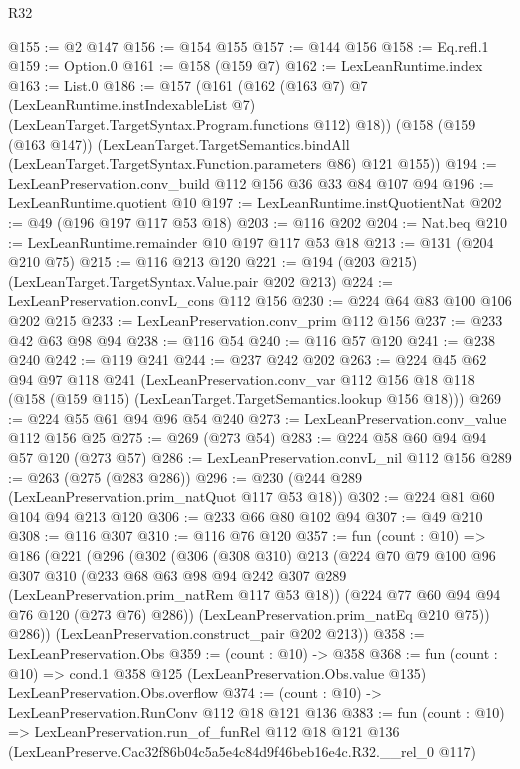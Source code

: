 \begin{lexlean}{R32}
\begin{coremodule}
@155 := @2 @147
@156 := @154 @155
@157 := @144 @156
@158 := Eq.refl.{1}
@159 := Option.{0}
@161 := @158 (@159 @7)
@162 := LexLeanRuntime.index
@163 := List.{0}
@186 := @157
    (@161
      (@162
        (@163 @7)
        @7
        (LexLeanRuntime.instIndexableList @7)
        (LexLeanTarget.TargetSyntax.Program.functions @112)
        @18))
    (@158
      (@159 (@163 @147))
      (LexLeanTarget.TargetSemantics.bindAll
        (LexLeanTarget.TargetSyntax.Function.parameters @86)
        @121
        @155))
@194 := LexLeanPreservation.conv_build @112 @156 @36 @33 @84 @107 @94
@196 := LexLeanRuntime.quotient @10
@197 := LexLeanRuntime.instQuotientNat
@202 := @49 (@196 @197 @117 @53 @18)
@203 := @116 @202
@204 := Nat.beq
@210 := LexLeanRuntime.remainder @10 @197 @117 @53 @18
@213 := @131 (@204 @210 @75)
@215 := @116 @213 @120
@221 := @194 (@203 @215) (LexLeanTarget.TargetSyntax.Value.pair @202 @213)
@224 := LexLeanPreservation.convL_cons @112 @156
@230 := @224 @64 @83 @100 @106 @202 @215
@233 := LexLeanPreservation.conv_prim @112 @156
@237 := @233 @42 @63 @98 @94
@238 := @116 @54
@240 := @116 @57 @120
@241 := @238 @240
@242 := @119 @241
@244 := @237 @242 @202
@263 := @224
    @45
    @62
    @94
    @97
    @118
    @241
    (LexLeanPreservation.conv_var
      @112
      @156
      @18
      @118
      (@158 (@159 @115) (LexLeanTarget.TargetSemantics.lookup @156 @18)))
@269 := @224 @55 @61 @94 @96 @54 @240
@273 := LexLeanPreservation.conv_value @112 @156 @25
@275 := @269 (@273 @54)
@283 := @224 @58 @60 @94 @94 @57 @120 (@273 @57)
@286 := LexLeanPreservation.convL_nil @112 @156
@289 := @263 (@275 (@283 @286))
@296 := @230 (@244 @289 (LexLeanPreservation.prim_natQuot @117 @53 @18))
@302 := @224 @81 @60 @104 @94 @213 @120
@306 := @233 @66 @80 @102 @94
@307 := @49 @210
@308 := @116 @307
@310 := @116 @76 @120
@357 := fun (count : @10) =>
  @186
    (@221
      (@296
        (@302
          (@306
            (@308 @310)
            @213
            (@224
              @70
              @79
              @100
              @96
              @307
              @310
              (@233 @68 @63 @98 @94 @242 @307 @289 (LexLeanPreservation.prim_natRem @117 @53 @18))
              (@224 @77 @60 @94 @94 @76 @120 (@273 @76) @286))
            (LexLeanPreservation.prim_natEq @210 @75))
          @286))
      (LexLeanPreservation.construct_pair @202 @213))
@358 := LexLeanPreservation.Obs
@359 := (count : @10) -> @358
@368 := fun (count : @10) =>
  cond.{1} @358 @125 (LexLeanPreservation.Obs.value @135) LexLeanPreservation.Obs.overflow
@374 := (count : @10) -> LexLeanPreservation.RunConv @112 @18 @121 @136
@383 := fun (count : @10) =>
  LexLeanPreservation.run_of_funRel
    @112
    @18
    @121
    @136
    (LexLeanPreserve.Cac32f86b04c5a5e4c84d9f46beb16e4c.R32.__rel_0 @117)
\end{coremodule}
\end{lexlean}
